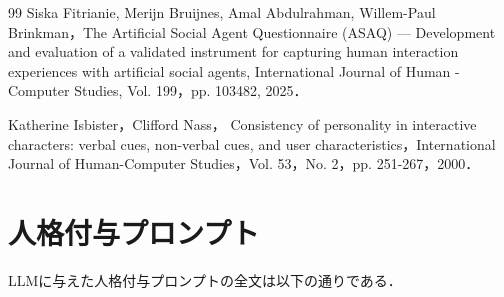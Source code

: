 \documentclass[10pt,twocolumn]{jsarticle}
\begin{document}
\begin{thebibliography}{99}
Siska Fitrianie, Merĳn Bruĳnes, Amal Abdulrahman, Willem-Paul Brinkman，The Artificial Social Agent Questionnaire (ASAQ) — Development and evaluation of a validated instrument for capturing human interaction experiences with artificial social agents, International Journal of Human - Computer Studies, Vol. 199，pp. 103482, 2025．

Katherine Isbister，Clifford Nass， Consistency of personality in interactive characters: verbal cues, non-verbal cues, and user characteristics，International Journal of Human-Computer Studies，Vol. 53，No. 2，pp. 251-267，2000．



\end{thebibliography}

\appendix

\section{人格付与プロンプト}
LLMに与えた人格付与プロンプトの全文は以下の通りである．
\end{document}

